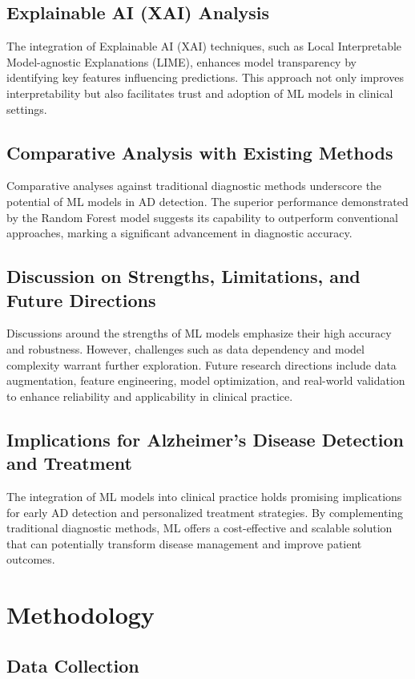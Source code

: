 \documentclass[a4paper,12pt]{report}
\begin{document}
\section*{Explainable AI (XAI) Analysis}
The integration of Explainable AI (XAI) techniques, such as Local Interpretable Model-agnostic Explanations (LIME), enhances model transparency by identifying key features influencing predictions. This approach not only improves interpretability but also facilitates trust and adoption of ML models in clinical settings.

\section*{Comparative Analysis with Existing Methods}
Comparative analyses against traditional diagnostic methods underscore the potential of ML models in AD detection. The superior performance demonstrated by the Random Forest model suggests its capability to outperform conventional approaches, marking a significant advancement in diagnostic accuracy.

\section*{Discussion on Strengths, Limitations, and Future Directions}
Discussions around the strengths of ML models emphasize their high accuracy and robustness. However, challenges such as data dependency and model complexity warrant further exploration. Future research directions include data augmentation, feature engineering, model optimization, and real-world validation to enhance reliability and applicability in clinical practice.

\section*{Implications for Alzheimer’s Disease Detection and Treatment}
The integration of ML models into clinical practice holds promising implications for early AD detection and personalized treatment strategies. By complementing traditional diagnostic methods, ML offers a cost-effective and scalable solution that can potentially transform disease management and improve patient outcomes.


\chapter{Methodology}
\section{Data Collection}
\end{document}
